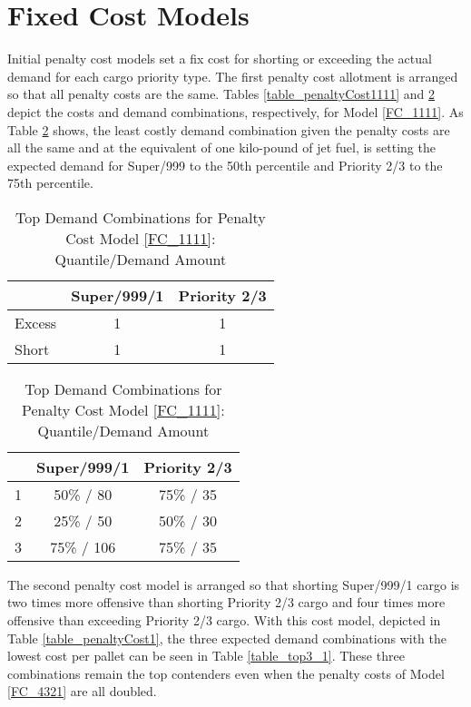\section{Fixed Cost Models}
Initial penalty cost models set a fix cost for shorting or exceeding the actual demand for each cargo priority type.  The first penalty cost allotment is arranged so that all penalty costs are the same. Tables \ref{table_penaltyCost1111} and \ref{table_top3_1111} depict the costs and demand combinations, respectively, for Model\label{FC_1111} \ref{FC_1111}. As Table \ref{table_top3_1111} shows, the least costly demand combination given the penalty costs are all the same and at the equivalent of one kilo-pound of jet fuel, is setting the expected demand for Super/999 to the 50th percentile and Priority 2/3 to the 75th percentile.
\begin{table}[H]
\centering
\begin{minipage}[b]{0.4\textwidth}
\caption{Penalty Cost Model \ref{FC_1111}}
\label{table_penaltyCost1111}
\begin{tabular}{@{}lcc@{}}
\toprule
 & Super/999/1 & Priority 2/3 \\ \midrule
Excess & 1 & 1 \\
Short & 1 & 1 \\ \bottomrule
\end{tabular}
\end{minipage}
\hspace{10mm}
\begin{minipage}[b]{0.4\textwidth}
\caption{Top Demand Combinations for Penalty Cost Model \ref{FC_1111}: Quantile/Demand Amount}
\label{table_top3_1111}
\begin{tabular}{@{}lcc@{}}
\toprule
 & Super/999/1 & Priority 2/3 \\ \midrule
1 & 50\% / 80 & 75\% / 35 \\
2 & 25\% / 50 & 50\% / 30 \\
3 & 75\% / 106 & 75\% / 35 \\ \bottomrule
\end{tabular}
\end{minipage}
\end{table}


The second penalty cost model is arranged so that shorting Super/999/1 cargo is two times more offensive than shorting Priority 2/3 cargo and four times more offensive than exceeding Priority 2/3 cargo. With this cost model, depicted in Table \ref{table_penaltyCost1}, the three expected demand combinations with the lowest cost per pallet can be seen in Table \ref{table_top3_1}. These three combinations remain the top contenders even when the penalty costs of Model\label{FC_4321} \ref{FC_4321} are all doubled.   

